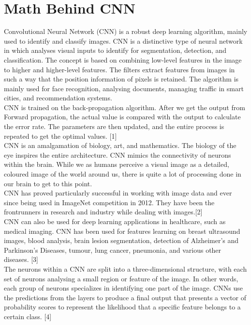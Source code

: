 \documentclass[12pt]{revtex4}
\begin{document}
\section{ Math Behind CNN}
Convolutional Neural Network (CNN) is a robust deep learning algorithm, mainly used to identify and classify images. CNN is a distinctive type of neural network in which analyses visual inputs to identify for segmentation, detection, and classification. The concept is based on combining low-level features in the image to higher and higher-level features. The filters extract features from images in such a way that the position information of pixels is retained. The algorithm is mainly used for face recognition, analysing documents, managing traffic in smart cities, and recommendation systems.
\\CNN is trained on the back-propagation algorithm. After we get the output from Forward propagation, the actual value is compared with the output to calculate the error rate. The parameters are then updated, and the entire process is repeated to get the optimal values. [1]
 \\CNN is an amalgamation of biology, art, and mathematics. The biology of the eye inspires the entire architecture. CNN mimics the connectivity of neurons within the brain. While we as humans perceive a visual image as a detailed, coloured image of the world around us, there is quite a lot of processing done in our brain to get to this point. 
\\CNN has proved particularly successful in working with image data and ever since being used in ImageNet competition in 2012. They have been the frontrunners in research and industry while dealing with images.[2]
\\CNN can also be used for deep learning applications in healthcare, such as medical imaging. CNN has been used for features learning on breast ultrasound images, blood analysis, brain lesion segmentation, detection of Alzheimer’s and Parkinson’s Diseases, tumour, lung cancer, pneumonia, and various other diseases. [3] 
\\The neurons within a CNN are split into a three-dimensional structure, with each set of neurons analysing a small region or feature of the image. In other words, each group of neurons specializes in identifying one part of the image. CNNs use the predictions from the layers to produce a final output that presents a vector of probability scores to represent the likelihood that a specific feature belongs to a certain class. [4]
\end{document}
